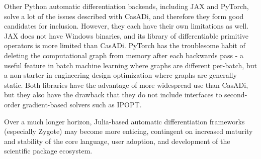 Other Python automatic differentiation backends, including JAX and PyTorch, solve a lot of the issues described with CasADi, and therefore they form good candidates for inclusion. However, they each have their own limitations as well. JAX does not have Windows binaries, and its library of differentiable primitive operators is more limited than CasADi. PyTorch has the troublesome habit of deleting the computational graph from memory after each backwards pass - a useful feature in batch machine learning where graphs are different per-batch, but a non-starter in engineering design optimization where graphs are generally static. Both libraries have the advantage of more widespread use than CasADi, but they also have the drawback that they do not include interfaces to second-order gradient-based solvers such as IPOPT.

Over a much longer horizon, Julia-based automatic differentiation frameworks (especially Zygote) may become more enticing, contingent on increased maturity and stability of the core language, user adoption, and development of the scientific package ecosystem.

%

%
%
